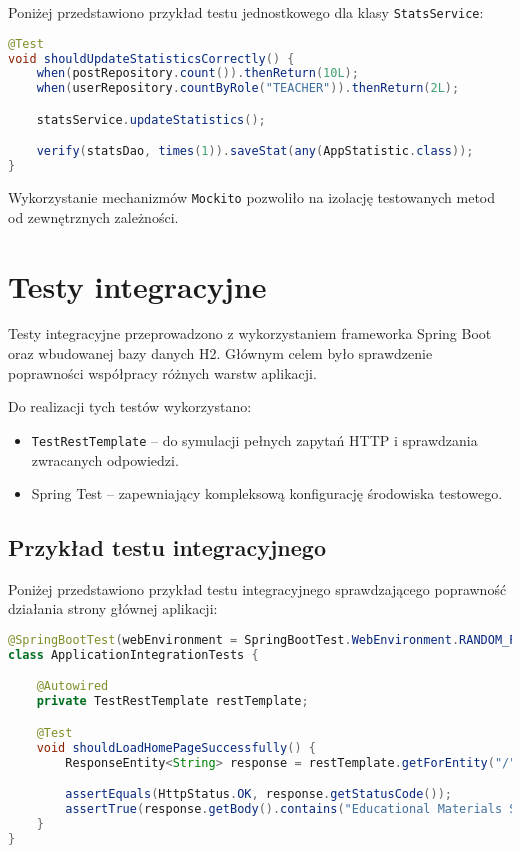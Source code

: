 Poniżej przedstawiono przykład testu jednostkowego dla klasy \texttt{StatsService}:

\begin{lstlisting}[language=Java]
@Test
void shouldUpdateStatisticsCorrectly() {
    when(postRepository.count()).thenReturn(10L);
    when(userRepository.countByRole("TEACHER")).thenReturn(2L);

    statsService.updateStatistics();

    verify(statsDao, times(1)).saveStat(any(AppStatistic.class));
}
\end{lstlisting}

Wykorzystanie mechanizmów \texttt{Mockito} pozwoliło na izolację testowanych metod od zewnętrznych zależności.

\section{Testy integracyjne}

Testy integracyjne przeprowadzono z wykorzystaniem frameworka Spring Boot oraz wbudowanej bazy danych H2. Głównym celem było sprawdzenie poprawności współpracy różnych warstw aplikacji.

Do realizacji tych testów wykorzystano:

\begin{itemize}
    \item \texttt{TestRestTemplate} – do symulacji pełnych zapytań HTTP i sprawdzania zwracanych odpowiedzi.
    \item Spring Test – zapewniający kompleksową konfigurację środowiska testowego.
\end{itemize}

\subsection{Przykład testu integracyjnego}

Poniżej przedstawiono przykład testu integracyjnego sprawdzającego poprawność działania strony głównej aplikacji:

\begin{lstlisting}[language=Java]
@SpringBootTest(webEnvironment = SpringBootTest.WebEnvironment.RANDOM_PORT)
class ApplicationIntegrationTests {

    @Autowired
    private TestRestTemplate restTemplate;

    @Test
    void shouldLoadHomePageSuccessfully() {
        ResponseEntity<String> response = restTemplate.getForEntity("/", String.class);

        assertEquals(HttpStatus.OK, response.getStatusCode());
        assertTrue(response.getBody().contains("Educational Materials Sharing Platform"));
    }
}
\end{lstlisting}

